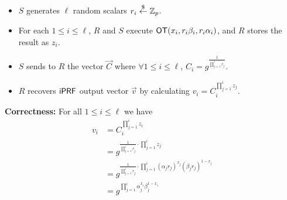 \begin{itemize}
\item $S$ generates $\ell$ random scalars $r_i\stackrel{\$}{\leftarrow}\mathbb{Z}_p$.
\item For each $1 \leq i \leq \ell$, $R$ and $S$ execute $\mathsf{OT}(x_i, r_i\beta_i,r_i\alpha_i)$, and $R$ stores the result as $z_i$.
\item $S$ sends to $R$ the vector $\vec{C}$ where $\forall 1 \leq i \leq \ell$, $C_i =  g^\frac{1}{\prod_{j=1}^{i} r_j}.$
\item $R$ recovers $\mathsf{i}\mathsf{PRF}$ output vector $\vec{v}$ by calculating $v_i
  = C_i^{\prod_{j=1}^{i} z_j}.$
\end{itemize}


{\bf Correctness:}  For all $1 \leq i \leq \ell$ we have
\begin{equation}
\begin{aligned}
v_i &= C_i^{\prod_{j=1}^{i} z_i} \\
&= g^{\frac{1}{\prod_{j=1}^{i} r_j} \cdot \prod_{j=1}^{i} z_j} \\
&= g^{\frac{1}{\prod_{j=1}^{i} r_j} \cdot \prod_{j=1}^{i} (\alpha_jr_j)^{x_j}(\beta_jr_j)^{1-x_j} } \\
&= g^{\prod_{j=1}^{i} \alpha_j^{x_i}\beta_j^{1-x_i}}
\end{aligned}
\end{equation}



